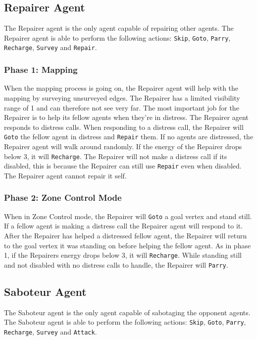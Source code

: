 \documentclass[11pt]{article}
\begin{document}
\subsection{Repairer Agent}
The Repairer agent is the only agent capable of repairing other agents. The Repairer agent is able to perform the following actions: {\tt Skip}, {\tt Goto}, {\tt Parry}, {\tt Recharge}, {\tt Survey} and {\tt Repair}.

\subsubsection*{Phase 1: Mapping}
When the mapping process is going on, the Repairer agent will help with the mapping by surveying unsurveyed edges. The Repairer has a limited visibility range of 1 and can therefore not see very far. The most important job for the Repairer is to help its fellow agents when they're in distress. The Repairer agent responds to distress calls. When responding to a distress call, the Repairer will {\tt Goto} the fellow agent in distress and {\tt Repair} them. If no agents are distressed, the Repairer agent will walk around randomly. If the energy of the Repairer drops below 3, it will {\tt Recharge}. The Repairer will not make a distress call if its disabled, this is because the Repairer can still use {\tt Repair} even when disabled. The Repairer agent cannot repair it self.

\subsubsection*{Phase 2: Zone Control Mode}
When in Zone Control mode, the Repairer will {\tt Goto} a goal vertex and stand still. If a fellow agent is making a distress call the Repairer agent will respond to it. After the Repairer has helped a distressed fellow agent, the Repairer will return to the goal vertex it was standing on before helping the fellow agent. As in phase 1, if the Repairers energy drops below 3, it will {\tt Recharge}. While standing still and not disabled with no distress calls to handle, the Repairer will {\tt Parry}.

\subsection{Saboteur Agent}
The Saboteur agent is the only agent capable of sabotaging the opponent agents. The Saboteur agent is able to perform the following actions: {\tt Skip}, {\tt Goto}, {\tt Parry}, {\tt Recharge}, {\tt Survey} and {\tt Attack}.
\end{document}
